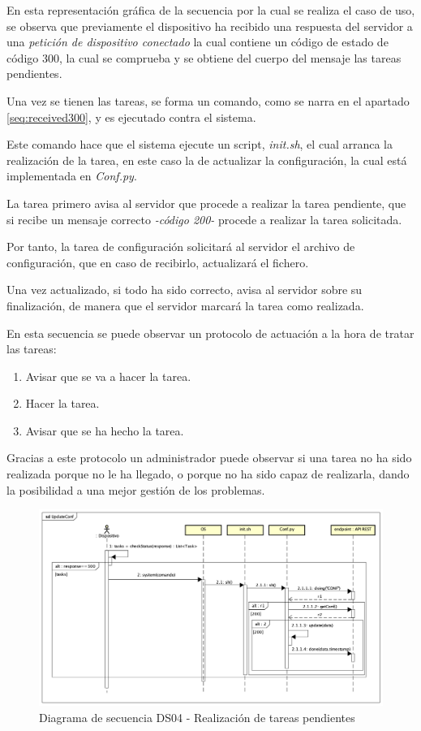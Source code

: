 En esta representación gráfica de la secuencia por la cual se realiza el caso de uso, se observa que previamente el dispositivo ha recibido una respuesta del servidor a una \textit{petición de dispositivo conectado} la cual contiene un código de estado de código 300, la cual se comprueba y se obtiene del cuerpo del mensaje las tareas pendientes.

Una vez se tienen las tareas, se forma un comando, como se narra en el apartado \ref{seq:received300}, y es ejecutado contra el sistema.

Este comando hace que el sistema ejecute un script, \textit{init.sh}, el cual arranca la realización de la tarea, en este caso la de actualizar la configuración, la cual está implementada en \textit{Conf.py}.

La tarea primero avisa al servidor que procede a realizar la tarea pendiente, que si recibe un mensaje correcto \textit{-código 200-} procede a realizar la tarea solicitada.

Por tanto, la tarea de configuración solicitará al servidor el archivo de configuración, que en caso de recibirlo, actualizará el fichero.

Una vez actualizado, si todo ha sido correcto, avisa al servidor sobre su finalización, de manera que el servidor marcará la tarea como realizada.

En esta secuencia se puede observar un protocolo de actuación a la hora de tratar las tareas:

\begin{enumerate}
    \item Avisar que se va a hacer la tarea.
    \item Hacer la tarea.
    \item Avisar que se ha hecho la tarea.
\end{enumerate}

Gracias a este protocolo un administrador puede observar si una tarea no ha sido realizada porque no le ha llegado, o porque no ha sido capaz de realizarla, dando la posibilidad a una mejor gestión de los problemas.

\begin{figure}[H]
    \centering
    \includegraphics[width=14cm]{./img/sequence/diagram/conftask.png}
    \caption{Diagrama de secuencia DS04 - Realización de tareas pendientes}
    \label{fig:seq.alive}
\end{figure}

